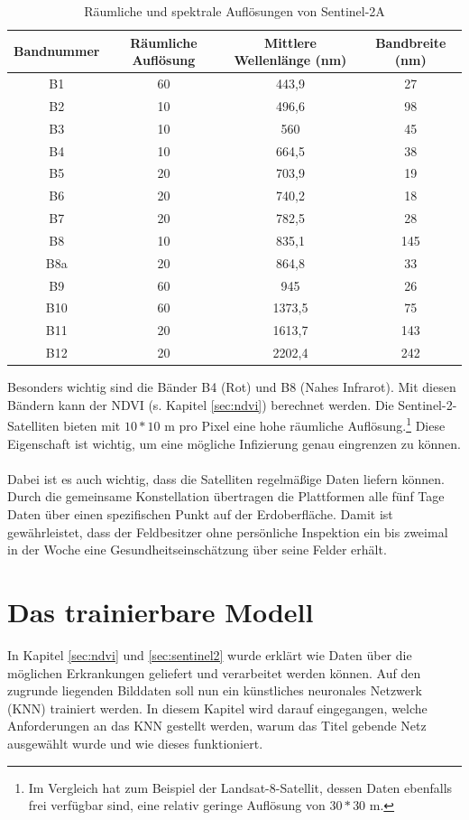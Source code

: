 \begin{table}[ht]
\begin{tabular}{c|c|c|c}
Bandnummer & Räumliche Auflösung & Mittlere Wellenlänge (nm) & Bandbreite (nm) \\
\hline
B1 & 60 & 443,9 & 27\\
B2 & 10 & 496,6 & 98\\
B3 & 10 & 560 & 45\\
B4 & 10 & 664,5 & 38\\
B5 & 20 & 703,9 & 19\\
B6 & 20 & 740,2 & 18\\
B7 & 20 & 782,5 & 28\\
B8 & 10 & 835,1 & 145\\
B8a & 20 & 864,8 & 33\\
B9 & 60 & 945 & 26\\
B10 & 60 & 1373,5 & 75\\
B11 & 20 & 1613,7 & 143\\
B12 & 20 & 2202,4 & 242\\
\end{tabular}
\caption{Räumliche und spektrale Auflösungen von Sentinel-2A\cite{ref:sentinel:radiores}}\label{tab:resolutions}
\end{table}
\noindent
Besonders wichtig sind die Bänder B4 (Rot) und B8 (Nahes Infrarot). Mit diesen Bändern kann der NDVI (s. Kapitel \ref{sec:ndvi}) berechnet werden.\cite{ref:sentinel:ndvi} Die Sentinel-2-Satelliten bieten mit $10*10$ m pro Pixel eine hohe räumliche Auflösung.\footnote{Im Vergleich hat zum Beispiel der Landsat-8-Satellit, dessen Daten ebenfalls frei verfügbar sind, eine relativ geringe Auflösung von $30*30$ m.\cite{ref:landsat}} Diese Eigenschaft ist wichtig, um eine mögliche Infizierung genau eingrenzen zu können.\\\\
Dabei ist es auch wichtig, dass die Satelliten regelmäßige Daten liefern können. Durch die gemeinsame Konstellation übertragen die Plattformen alle fünf Tage Daten über einen spezifischen Punkt auf der Erdoberfläche.\cite{ref:sentinel:resolutions} Damit ist gewährleistet, dass der Feldbesitzer ohne persönliche Inspektion ein bis zweimal in der Woche eine Gesundheitseinschätzung über seine Felder erhält.

\section{Das trainierbare Modell}\label{sec:maskrcnn}
In Kapitel \ref{sec:ndvi} und \ref{sec:sentinel2} wurde erklärt wie Daten über die möglichen Erkrankungen geliefert und verarbeitet werden können. Auf den zugrunde liegenden Bilddaten soll nun ein künstliches neuronales Netzwerk (KNN) trainiert werden. In diesem Kapitel wird darauf eingegangen, welche Anforderungen an das KNN gestellt werden, warum das Titel gebende Netz ausgewählt wurde und wie dieses funktioniert.

